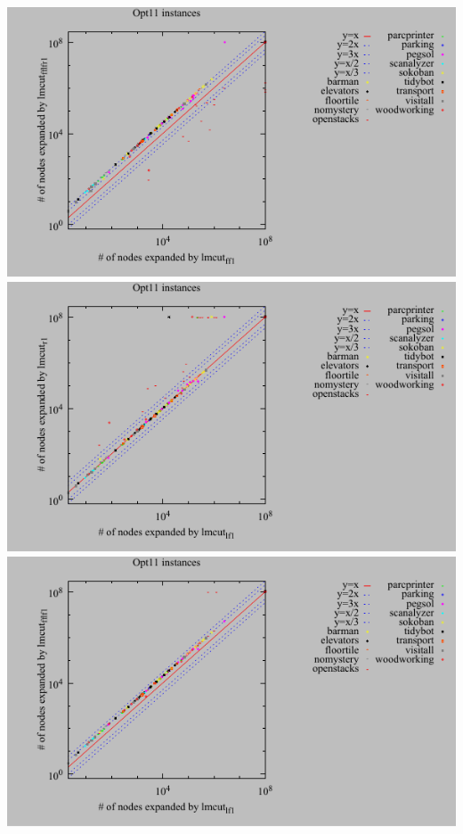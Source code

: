 \includegraphics{tables/opt11-expanded-lmcut_ff-lmcut_fflfr.pdf}
\linebreak
\includegraphics{tables/opt11-expanded-lmcut_lf-lmcut_r.pdf}
\linebreak
\includegraphics{tables/opt11-expanded-lmcut_lf-lmcut_fflf.pdf}
\linebreak
